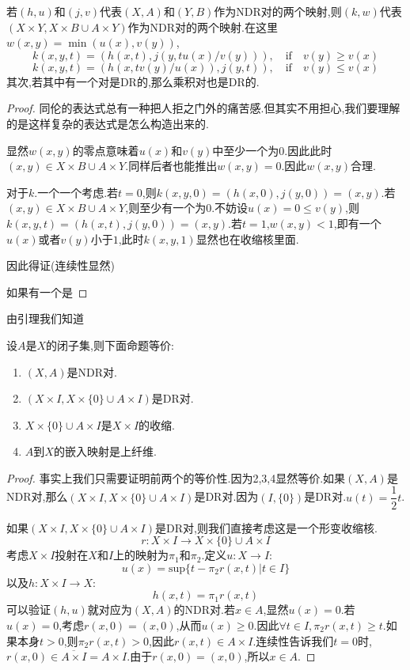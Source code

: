 \begin{lemma}
    若$(h,u)$和$(j,v)$代表$(X,A)$和$(Y,B)$作为NDR对的两个映射,则$(k,w)$代表$(X\times Y,X \times B \cup A \times Y)$作为NDR对的两个映射.在这里$w(x,y)=\min(u(x),v(y))$,
    $$
    k(x,y,t)=(h(x,t),j(y,tu(x)/v(y))),\quad \mathrm{if} \quad v(y)\geq v(x)
    $$
    $$
    k(x,y,t)=(h(x,tv(y)/u(x)),j(y,t)),\quad \mathrm{if} \quad v(y)\leq v(x)
    $$
    其次,若其中有一个对是DR的,那么乘积对也是DR的.
\end{lemma}
\begin{proof}
    同伦的表达式总有一种把人拒之门外的痛苦感.但其实不用担心,我们要理解的是这样复杂的表达式是怎么构造出来的.

    显然$w(x,y)$的零点意味着$u(x)$和$v(y)$中至少一个为$0$.因此此时$(x,y)\in X \times B\cup A \times Y$.同样后者也能推出$w(x,y)=0$.因此$w(x,y)$合理.

   对于$k$.一个一个考虑.若$t=0$,则$k(x,y,0)=(h(x,0),j(y,0))=(x,y)$.若$ (x,y)\in X \times B \cup A \times Y$,则至少有一个为$0$.不妨设$u(x)=0 \leq v(y)$,则$k(x,y,t)=(h(x,t),j(y,0))=(x,y)$.若$t=1$,$w(x,y)<1$,即有一个$u(x)$或者$v(y)$小于$1$,此时$k(x,y,1)$显然也在收缩核里面.

   因此得证(连续性显然)

   如果有一个是
\end{proof}
由引理我们知道
\begin{theorem}
    设$A$是$X$的闭子集,则下面命题等价:
    \begin{enumerate}
        \item $(X,A)$是NDR对.
        \item $(X\times I,X \times \{0\}\cup A \times I)$是DR对.
        \item $X \times\{0\}\cup A \times I$是$X \times I$的收缩.
        \item $A$到$X$的嵌入映射是上纤维.
    \end{enumerate}
\end{theorem}
\begin{proof}
    事实上我们只需要证明前两个的等价性.因为2,3,4显然等价.如果$(X,A)$是NDR对,那么$(X\times I,X \times \{0\}\cup A \times I)$是DR对.因为$(I,\{0\})$是DR对.$u(t)=\dfrac{1}{2}t$.

    如果$(X\times I,X \times \{0\}\cup A \times I)$是DR对,则我们直接考虑这是一个形变收缩核.
    $$
    r:X \times I \to X \times \{0\}\cup A \times I
    $$
    考虑$X\times I$投射在$X$和$I$上的映射为$\pi_1$和$\pi_2$.定义$u:X \to I$:
    $$
    u(x)=\mathrm{sup}\{t-\pi_2r(x,t)|t \in I\}
    $$
    以及$h:X \times I \to X$:
    $$
    h(x,t)=\pi_1r(x,t)
    $$
    可以验证$(h,u)$就对应为$(X,A)$的NDR对.若$x \in A$,显然$u(x)=0$.若$u(x)=0$,考虑$r(x,0)=(x,0)$,从而$u(x) \geq 0$.因此$\forall t \in I,\pi_2r(x,t)\geq t$.如果本身$t>0$,则$\pi_2r(x,t)>0$,因此$r(x,t)\in A\times I$.连续性告诉我们$t=0$时,$r(x,0)\in \overline{A \times I}=A \times I$.由于$r(x,0)=(x,0)$,所以$x \in A$. 
\end{proof}
